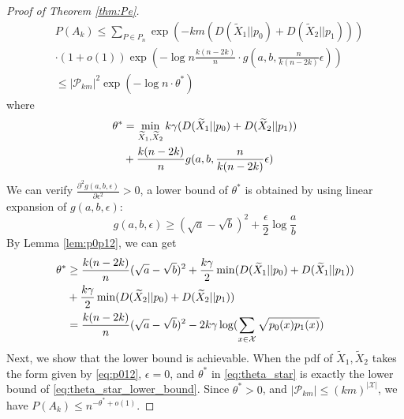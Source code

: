 \documentclass[conference]{IEEEtran}
\begin{document}
\begin{proof}[Proof of Theorem \ref{thm:Pe}]
\begin{align*}
		&P(A_k)  \leq \sum_{P \in P_n} \exp(-km (D(\widetilde{X}_1 || p_0) + D(\widetilde{X}_2 || p_1))) \\
		& \cdot (1+o(1))\exp(-\log n \frac{k(n-2k)}{n}\cdot g(a, b, \frac{n}{k(n-2k)}\epsilon) ) \\
		&\leq |\mathcal{P}_{km}|^2 \exp(-\log n \cdot \theta^*) 
		\end{align*}
		where
		\begin{align}
		\theta^* &= \min_{\widetilde{X}_1,\widetilde{X}_2} k\gamma (D(\widetilde{X}_1|| p_0) + D(\widetilde{X}_2 || p_1)) \notag \\
		& + \frac{k(n-2k)}{n} g(a,b, \frac{n}{k(n-2k)}\epsilon) \label{eq:theta_star}
		\end{align}
		We can verify $\frac{\partial^2 g(a,b,\epsilon)}{\partial \epsilon^2} > 0$,
		a lower bound of $\theta^*$ is obtained by using linear expansion of $g(a,b, \epsilon)$:
		\begin{equation*}
		g(a,b,\epsilon) \geq  (\sqrt{a} - \sqrt{b})^2 + \frac{\epsilon}{2}\log \frac{a}{b} 
		\end{equation*}
		By Lemma \ref{lem:p0p12}, we can get
		{\scriptsize
			\begin{align}
			\theta^* &\geq \frac{k(n-2k)}{n}(\sqrt{a} - \sqrt{b})^2
			+ \frac{k \gamma}{2}\min (D(\widetilde{X}_1||p_0) + D(\widetilde{X}_1||p_1)) \notag \\
			&+ \frac{k \gamma}{2}\min (D(\widetilde{X}_2||p_0) + D(\widetilde{X}_2||p_1))\notag \\
			&=  \frac{k(n-2k)}{n}(\sqrt{a} - \sqrt{b})^2 - 2 k\gamma\log(\sum_{x\in\mathcal{X}}\sqrt{p_0(x)p_1(x)}) 
			\label{eq:theta_star_lower_bound}
			\end{align}
		}
		Next, we show that the lower bound is achievable.
		When the pdf of $\widetilde{X}_1, \widetilde{X}_2$ takes the form given by \eqref{eq:p012},
		$\epsilon = 0$, and $\theta^*$ in \eqref{eq:theta_star} is exactly the lower bound of \eqref{eq:theta_star_lower_bound}.
		Since $\theta^*>0$,
		and $|\mathcal{P}_{km}|\leq (km)^{|\mathcal{X}|} $, we have $P(A_k) \leq n^{-\theta^*+o(1)}$.
		

\end{proof}
\end{document}
